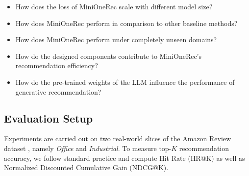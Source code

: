 \begin{itemize}
    \item How does the loss of MiniOneRec scale with different model size?
    
    \item How does MiniOneRec perform in comparison to other baseline methods?
    
    \item How does MiniOneRec perform under completely unseen domains?
    
    \item How do the designed components contribute to MiniOneRec's recommendation efficiency?

    \item How do the pre-trained weights of the LLM influence the performance of generative recommendation?

\end{itemize}

\subsection{Evaluation Setup}


Experiments are carried out on two real-world slices of the Amazon Review dataset \citep{amazon}, namely \textit{Office} and \textit{Industrial}. To measure top-$K$ recommendation accuracy, we follow standard practice and compute Hit Rate (HR@K) as well as Normalized Discounted Cumulative Gain (NDCG@K).


